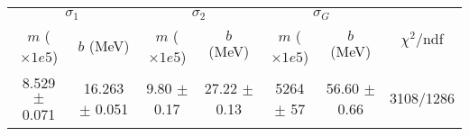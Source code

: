\begin{tabular}{cc|cc|cc||c}
\multicolumn{2}{c|}{$\sigma_1$} & \multicolumn{2}{|c}{$\sigma_2$} & \multicolumn{2}{|c}{$\sigma_G$}  & \multirow{2}{*}{$\chi^2/$ndf}\\
$m$ ($\times1e5$) & $b$ (MeV) & $m$ ($\times1e5$) & $b$ (MeV) & $m$ ($\times1e5$) & $b$ (MeV) & \\
\hline
8.529 $\pm$ 0.071 & 16.263 $\pm$ 0.051 & 9.80 $\pm$ 0.17 & 27.22 $\pm$ 0.13 & 5264 $\pm$ 57 & 56.60 $\pm$ 0.66 & 3108/1286\\
\end{tabular}
